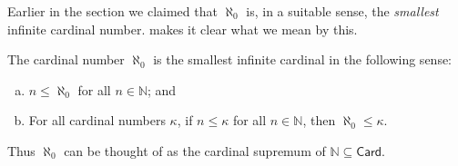 Earlier in the section we claimed that $\aleph_0$ is, in a suitable sense, the \textit{smallest} infinite cardinal number.  makes it clear what we mean by this.

\begin{theorem}
\label{thmAlephNaughtIsSupremumOfNaturalNumbers}
The cardinal number $\aleph_0$ is the smallest infinite cardinal in the following sense:
\begin{enumerate}[(a)]
\item $n \le \aleph_0$ for all $n \in \mathbb{N}$; and
\item For all cardinal numbers $\kappa$, if $n \le \kappa$ for all $n \in \mathbb{N}$, then $\aleph_0 \le \kappa$.
\end{enumerate}
Thus $\aleph_0$ can be thought of as the cardinal supremum of $\mathbb{N} \subseteq \mathsf{Card}$.
\end{theorem}

